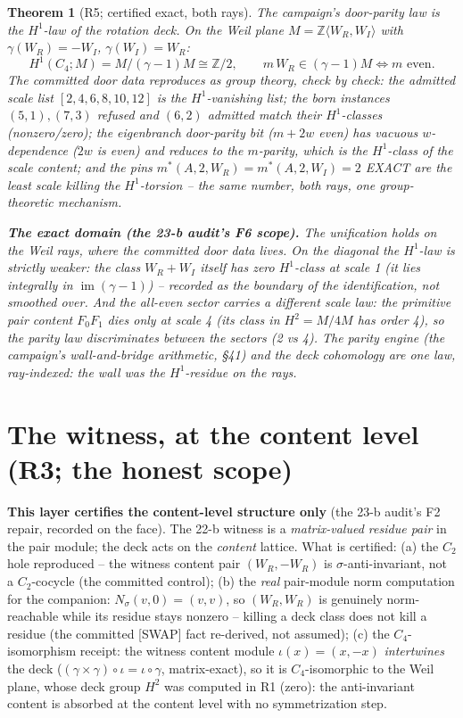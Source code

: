 \documentclass[11pt]{article}
\newtheorem{theorem}{Theorem}
\newcommand{\Z}{\mathbb Z}
\begin{document}
\begin{theorem}[R5; certified exact, both rays]
The campaign's door-parity law \emph{is} the $H^1$-law of the rotation
deck. On the Weil plane $M=\Z\langle W_R,W_I\rangle$ with
$\gamma(W_R)=-W_I$, $\gamma(W_I)=W_R$:
\[
H^1(C_4;M)=M/(\gamma-1)M\cong\Z/2,\qquad
m\,W_R\in(\gamma-1)M \iff m \text{ even}.
\]
The committed door data reproduces as group theory, check by check:
the admitted scale list $[2,4,6,8,10,12]$ \emph{is} the
$H^1$-vanishing list; the born instances $(5,1),(7,3)$ refused and
$(6,2)$ admitted match their $H^1$-classes (nonzero/zero); the
eigenbranch door-parity bit ($m+2w$ even) has vacuous $w$-dependence
($2w$ is even) and reduces to the $m$-parity, which is the
$H^1$-class of the scale content; and the pins
$m^*(A,2,W_R)=m^*(A,2,W_I)=2$ EXACT are the \emph{least} scale killing
the $H^1$-torsion -- the same number, both rays, one group-theoretic
mechanism.

\textbf{The exact domain (the 23-b audit's F6 scope).} The unification
holds \emph{on the Weil rays}, where the committed door data lives. On
the diagonal the $H^1$-law is strictly weaker: the class $W_R+W_I$
itself has zero $H^1$-class at scale 1 (it lies integrally in
$\operatorname{im}(\gamma-1)$) -- recorded as the boundary of the
identification, not smoothed over. And the all-even sector carries a
\emph{different} scale law: the primitive pair content $F_0F_1$ dies
only at scale 4 (its class in $H^2=M/4M$ has order 4), so the parity
law discriminates between the sectors (2 vs 4). The parity engine
(the campaign's wall-and-bridge arithmetic, §41) and the deck
cohomology are one law, ray-indexed: the wall was the $H^1$-residue
on the rays.
\end{theorem}

\section{The witness, at the content level (R3; the honest scope)}

\textbf{This layer certifies the content-level structure only} (the
23-b audit's F2 repair, recorded on the face). The 22-b witness is a
\emph{matrix-valued residue pair} in the pair module; the deck acts on
the \emph{content} lattice. What is certified: (a) the $C_2$ hole
reproduced -- the witness content pair $(W_R,-W_R)$ is
$\sigma$-anti-invariant, not a $C_2$-cocycle (the committed control);
(b) the \emph{real} pair-module norm computation for the companion:
$N_\sigma(v,0)=(v,v)$, so $(W_R,W_R)$ is genuinely norm-reachable while
its residue stays nonzero -- killing a deck class does not kill a
residue (the committed [SWAP] fact re-derived, not assumed); (c) the
$C_4$-isomorphism receipt: the witness content module
$\iota(x)=(x,-x)$ \emph{intertwines} the deck
($(\gamma\times\gamma)\circ\iota=\iota\circ\gamma$,
matrix-exact), so it is $C_4$-isomorphic to the Weil plane, whose deck
group $H^2$ was computed in R1 (zero): the anti-invariant content is
absorbed at the content level with no symmetrization step.
\end{document}
